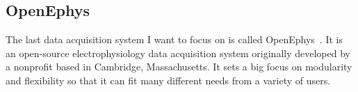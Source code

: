 \subsection{OpenEphys}

The last data acquisition system I want to focus on is called OpenEphys~\cite{openEphys}. It is an open-source electrophysiology data acquisition system originally developed by a nonprofit based in Cambridge, Massachusetts. It sets a big focus on modularity and flexibility so that it can fit many different needs from a variety of users.\\

